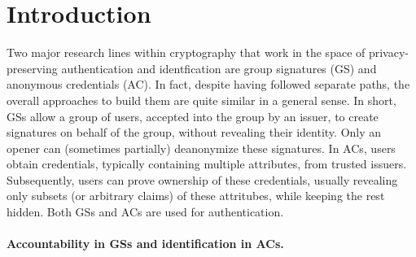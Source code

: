 \section{Introduction}
\label{sec:introduction}




\iffalse
{}

Two major research lines within cryptography that work in the space of
privacy-preserving authentication and identfication are group
signatures (GS) and anonymous credentials (AC). In fact, despite having followed
separate paths, the overall approaches to build them are quite similar in a
general sense.
%
In short, GSs allow a group of users, accepted into the group by an issuer, to
create signatures on behalf of the group, without revealing their identity. Only
an opener can (sometimes partially) deanonymize these signatures. In ACs, users
obtain credentials, typically containing multiple attributes, from trusted
issuers. Subsequently, users can prove ownership of these credentials, usually
revealing only subsets (or arbitrary claims) of these attritubes, while keeping
the rest hidden. Both GSs and ACs are used for authentication.

\paragraph{Accountability in GSs and identification in ACs.} %

